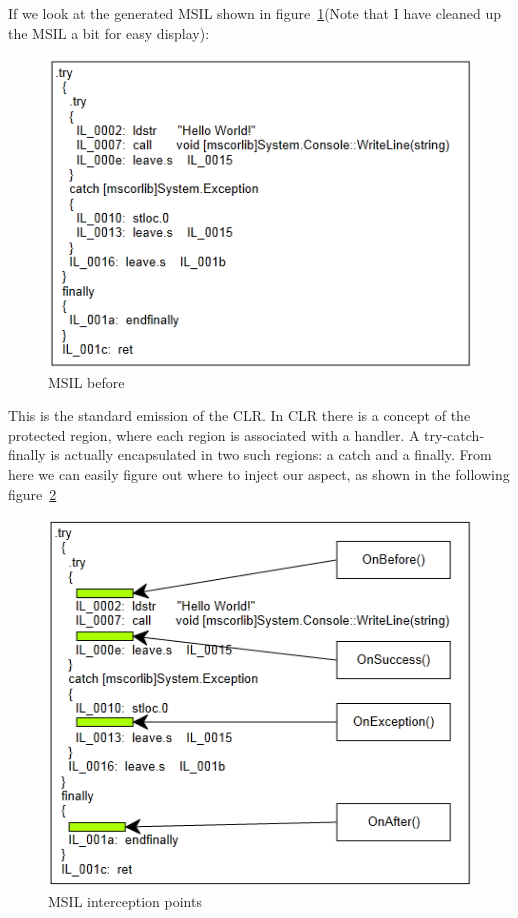 If we look at the generated MSIL shown in figure~\ref{methodboundary01}(Note that I have cleaned up the MSIL a bit for easy display):

\begin{figure}[here]
  \includegraphics[scale=1.0]{MethodBoundaryOverviewB4.PNG}
  \centering
  \caption{MSIL before\label{methodboundary01}}
\end{figure}

This is the standard emission of the CLR. In CLR there is a concept of the protected region, where each region is associated with a handler. A try-catch-finally is actually encapsulated in two such regions: a catch and a finally. From here we can easily figure out where to inject our aspect, as shown in the following figure~\ref{methodboundary02}

\begin{figure}[here]
  \includegraphics[scale=1.0]{MethodBoundaryOverview.PNG}
  \centering
  \caption{MSIL interception points\label{methodboundary02}}
\end{figure}

